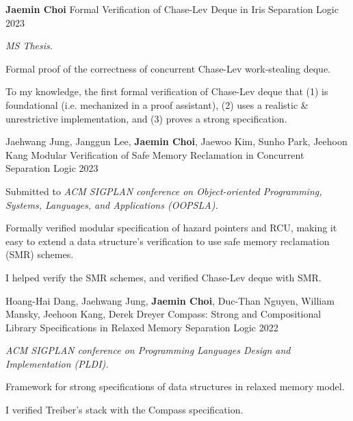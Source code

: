 

\begin{cventries}

  \cventry
    {\textbf{Jaemin Choi}} %
    {Formal Verification of Chase-Lev Deque in Iris Separation Logic} %
    {} %
    {2023} %
    {
      \begin{cvitems}
        \item[] \textit{MS Thesis.}
        \item Formal proof of the correctness of concurrent Chase-Lev work-stealing deque.
        \item To my knowledge, the first formal verification of Chase-Lev deque that (1) is foundational (i.e. mechanized in a proof assistant), (2) uses a realistic \& unrestrictive implementation, and (3) proves a strong specification.
      \end{cvitems}
    }

  \cventry
    {Jaehwang Jung, Janggun Lee, \textbf{Jaemin Choi}, Jaewoo Kim, Sunho Park, Jeehoon Kang} %
    {Modular Verification of Safe Memory Reclamation in Concurrent Separation Logic} %
    {} %
    {2023} %
    {
      \begin{cvitems}
        \item[] Submitted to \textit{ACM SIGPLAN conference on Object-oriented Programming, Systems, Languages, and Applications (OOPSLA).}
        \item Formally verified modular specification of hazard pointers and RCU, making it easy to extend a data structure's verification to use safe memory reclamation (SMR) schemes.
        \item I helped verify the SMR schemes, and verified Chase-Lev deque with SMR.
      \end{cvitems}
    }

  \cventry
    {Hoang-Hai Dang, Jaehwang Jung, \textbf{Jaemin Choi}, Duc-Than Nguyen, William Mansky, Jeehoon Kang, Derek Dreyer} %
    {Compass: Strong and Compositional Library Specifications in Relaxed Memory Separation Logic} %
    {} %
    {2022} %
    {
      \begin{cvitems}
        \item[] \textit{ACM SIGPLAN conference on Programming Languages Design and Implementation (PLDI).}
        \item Framework for strong specifications of data structures in relaxed memory model.
        \item I verified Treiber's stack with the Compass specification.
      \end{cvitems}
    }


\end{cventries}
